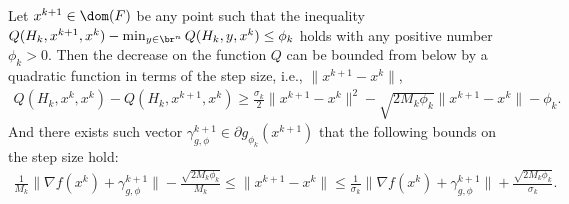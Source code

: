 \documentclass[11pt]{article}
\numberwithin{equation}{section}
\begin{document}
\begin{lemma}\label{lem:bound_step_size_inexact}
Let $x^{k+1} \in \dom(F)$ be any point such that the inequality $Q(H_k, x^{k+1},x^k)-\min_{y\in\br^n} Q(H_k, y,x^k)\leq \phi_k$ holds with any positive number $\phi_k > 0$. Then the decrease on the function $Q$ can be bounded from below by a quadratic function in terms of the step size, i.e., $\|x^{k+1} - x^k\|$,
\begin{align}
	\label{equ:bound_Qk_Qk1_inexact}
    Q(H_k,x^k,x^k) - Q(H_k,x^{k+1}, x^k) \geq \frac{\sigma_k}{2}\|x^{k+1}-x^k\|^2-\sqrt{2M_k\phi_k}\|x^{k+1}-x^k\| - \phi_k.
\end{align}
And there exists such vector $\gamma_{g, \phi}^{k+1} \in \partial g_{\phi_k}(x^{k+1})$ that the following bounds on the step size hold: 
\begin{align}
    \label{equ:bound_step_size_inexact}
    \frac{1}{M_k}\|  \nabla f(x^k) + \gamma_{g, \phi}^{k+1} \|- \frac{\sqrt{2M_k\phi_k}}{M_k} 
    \leq 
    \|x^{k+1} - x^k\| 
    \leq 
    \frac{1}{\sigma_k}\|  \nabla f(x^k) + \gamma_{g, \phi}^{k+1} \| + \frac{\sqrt{2M_k\phi_k}}{\sigma_k}.
\end{align}
\end{lemma}
\end{document}
